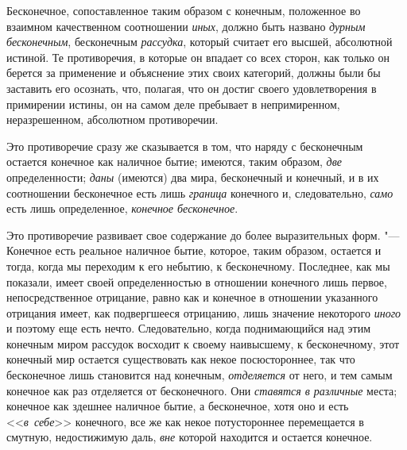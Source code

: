 Бесконечное, сопоставленное таким образом с конечным, положенное во взаимном
качественном соотношении {\em иных}, должно быть
названо {\em дурным бесконечным}, бесконечным
{\em рассудка}, который считает его высшей, абсолютной
истиной. Те противоречия, в которые он впадает со всех сторон, как только
он берется за применение и объяснение этих своих категорий, должны были бы
заставить его осознать, что, полагая, что он достиг своего удовлетворения в
примирении истины, он на самом деле пребывает в непримиренном,
неразрешенном, абсолютном противоречии.

Это противоречие сразу же сказывается в том, что наряду с бесконечным
остается конечное как наличное бытие; имеются, таким образом,
{\em две} определенности;
{\em даны} (имеются) два мира, бесконечный и конечный,
и в их соотношении бесконечное есть лишь {\em граница}
конечного и, следовательно, {\em само} есть лишь
определенное, {\em конечное бесконечное}.

Это противоречие развивает свое содержание до более выразительных форм. "---
Конечное есть реальное наличное бытие, которое, таким образом, остается и
тогда, когда мы переходим к его небытию, к бесконечному. Последнее, как мы
показали, имеет своей определенностью в отношении конечного лишь первое,
непосредственное отрицание, равно как и конечное в отношении указанного
отрицания имеет, как подвергшееся отрицанию, лишь значение некоторого
{\em иного} и поэтому еще есть нечто. Следовательно,
когда поднимающийся над этим конечным миром рассудок восходит к своему
наивысшему, к бесконечному, этот конечный мир остается существовать как
некое посюстороннее, так что бесконечное лишь становится над конечным,
{\em отделяется} от него, и тем самым конечное как раз
отделяется от бесконечного. Они {\em ставятся в
различные} места; конечное как здешнее наличное бытие, а бесконечное, хотя
оно и есть <<{\em в~себе}>> конечного, все же как некое
потустороннее перемещается в смутную, недостижимую даль,
{\em вне} которой находится и остается конечное.

